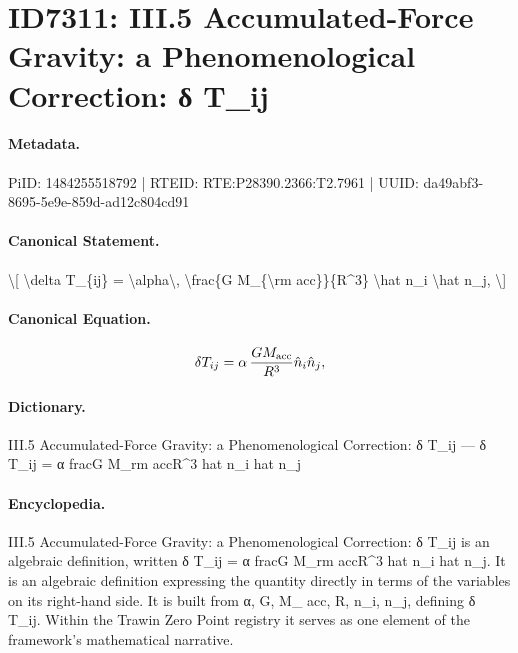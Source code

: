 \section*{ID7311: III.5 Accumulated-Force Gravity: a Phenomenological Correction: δ T\_ij}
\paragraph{Metadata.}
PiID: 1484255518792 | RTEID: RTE:P28390.2366:T2.7961 | UUID: da49abf3-8695-5e9e-859d-ad12c804cd91

\paragraph{Canonical Statement.}
\textbackslash{}[ \textbackslash{}delta T\_\{ij\} = \textbackslash{}alpha\textbackslash{}, \textbackslash{}frac\{G M\_\{\textbackslash{}rm acc\}\}\{R\textasciicircum{}3\} \textbackslash{}hat n\_i \textbackslash{}hat n\_j, \textbackslash{}]

\paragraph{Canonical Equation.}
\[
\delta T_{ij} = \alpha\, \frac{G M_{\rm acc}}{R^3} \hat n_i \hat n_j,
\]

\paragraph{Dictionary.}
III.5 Accumulated-Force Gravity: a Phenomenological Correction: δ T\_ij — δ T\_ij = α fracG M\_rm accR\textasciicircum{}3 hat n\_i hat n\_j

\paragraph{Encyclopedia.}
III.5 Accumulated-Force Gravity: a Phenomenological Correction: δ T\_ij is an algebraic definition, written δ T\_ij = α fracG M\_rm accR\textasciicircum{}3 hat n\_i hat n\_j. It is an algebraic definition expressing the quantity directly in terms of the variables on its right-hand side. It is built from α, G, M\_ acc, R, n\_i, n\_j, defining δ T\_ij. Within the Trawin Zero Point registry it serves as one element of the framework's mathematical narrative.
